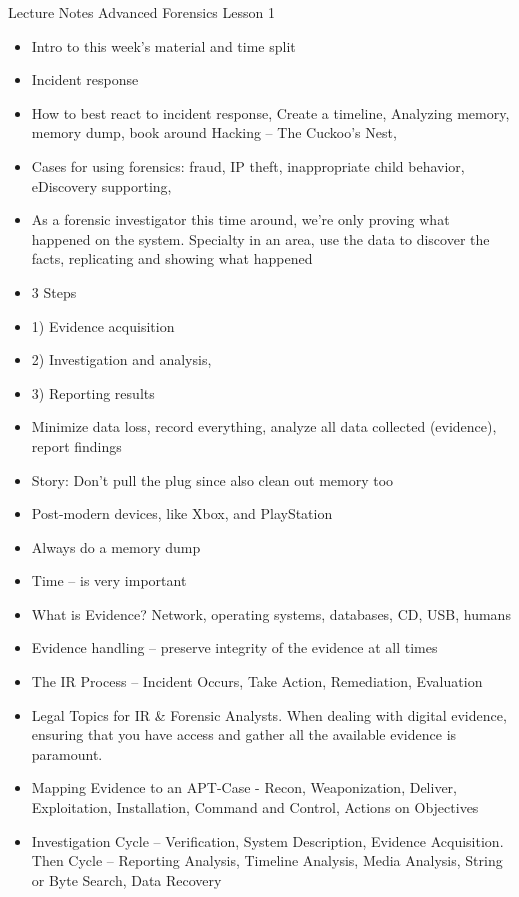 \documentclass[12pt]{article}
\begin{document}
\newpage
\newline
Lecture Notes
\newline
Advanced Forensics Lesson 1
\begin{itemize}
\item Intro to this week’s material and time split
\item Incident response
\item How to best react to incident response, Create a timeline, Analyzing memory, memory dump, book around Hacking – The Cuckoo’s Nest, 
\item Cases for using forensics: fraud, IP theft, inappropriate child behavior, eDiscovery supporting,  
\item As a forensic investigator this time around, we’re only proving what happened on the system. Specialty in an area, use the data to discover the facts, replicating and showing what happened
\item 3 Steps 
\item 1) Evidence acquisition
\item 2) Investigation and analysis,
\item 3) Reporting results
\item Minimize data loss, record everything, analyze all data collected (evidence), report findings
\item Story: Don’t pull the plug since also clean out memory too
\item Post-modern devices, like Xbox, and PlayStation
\item Always do a memory dump
\item Time – is very important
\item What is Evidence? Network, operating systems, databases, CD, USB, humans
\item Evidence handling – preserve integrity of the evidence at all times
\item The IR Process – Incident Occurs, Take Action, Remediation, Evaluation
\item Legal Topics for IR & Forensic Analysts. When dealing with digital evidence, ensuring that you have access and gather all the available evidence is paramount.
\item Mapping Evidence to an APT-Case - Recon, Weaponization, Deliver, Exploitation, Installation, Command and Control, Actions on Objectives
\item Investigation Cycle – Verification, System Description, Evidence Acquisition. Then Cycle – Reporting Analysis, Timeline Analysis, Media Analysis, String or Byte Search, Data Recovery

\end{itemize}
\end{document}
